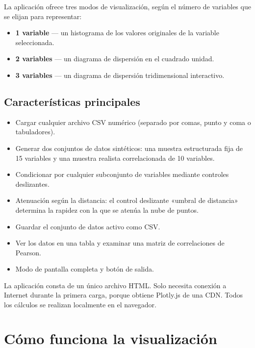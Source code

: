 \documentclass[11pt,a4paper]{article}
\begin{document}
La aplicación ofrece tres modos de visualización, según el número de variables que se elijan para representar:

\begin{itemize}[leftmargin=1.4em]
  \item \textbf{1 variable} --- un histograma de los valores originales de la variable seleccionada.
  \item \textbf{2 variables} --- un diagrama de dispersión en el cuadrado unidad.
  \item \textbf{3 variables} --- un diagrama de dispersión tridimensional interactivo.
\end{itemize}

\subsection{Características principales}

\begin{itemize}[leftmargin=1.4em]
  \item Cargar cualquier archivo CSV numérico (separado por comas, punto y coma o tabuladores).
  \item Generar dos conjuntos de datos sintéticos: una muestra estructurada fija de 15 variables y una muestra realista correlacionada de 10 variables.
  \item Condicionar por cualquier subconjunto de variables mediante controles deslizantes.
  \item Atenuación según la distancia: el control deslizante «umbral de distancia» determina la rapidez con la que se atenúa la nube de puntos.
  \item Guardar el conjunto de datos activo como CSV.
  \item Ver los datos en una tabla y examinar una matriz de correlaciones de Pearson.
  \item Modo de pantalla completa y botón de salida.
\end{itemize}

\begin{notebox}
La aplicación consta de un único archivo HTML. Solo necesita conexión a Internet durante la primera carga, porque obtiene Plotly.js de una CDN. Todos los cálculos se realizan localmente en el navegador.
\end{notebox}

\section{Cómo funciona la visualización}
\end{document}

